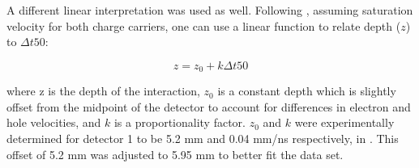 A different linear interpretation was used as well. Following \cite{cci21}, assuming saturation velocity for both charge carriers, one can use a linear function to relate depth ($z$) to $\Delta t50$:

\begin{equation}
z = z_0 + k \Delta t50
\end{equation}

where z is the depth of the interaction, $z_0$ is a constant depth which is slightly offset from the midpoint of the detector to account for differences in electron and hole velocities, and $k$ is a proportionality factor. $z_0$ and $k$ were experimentally determined for detector 1 to be 5.2 mm and 0.04 mm/ns respectively, in \cite{cci21}. This offset of 5.2 mm was adjusted to 5.95 mm to better fit the data set.
